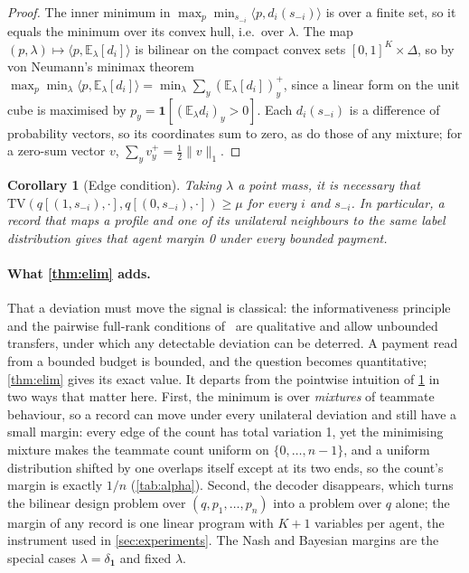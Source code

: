 \documentclass[sigconf,anonymous,acmthm=false]{acmart}
\theoremstyle{acmplain}
\newtheorem{corollary}{Corollary}
\theoremstyle{acmdefinition}
\newcommand{\E}{\mathbb{E}}
\newcommand{\TV}{\mathrm{TV}}
\begin{document}
\begin{proof}
The inner minimum in $\max_p\min_{s_{-i}}\langle p,d_i(s_{-i})\rangle$ is over a finite set,
so it equals the minimum over its convex hull, i.e.\ over $\lambda$. The map
$(p,\lambda)\mapsto\langle p,\E_\lambda[d_i]\rangle$ is bilinear on the compact convex sets
$[0,1]^K\times\Delta$, so by von Neumann's minimax theorem
$\max_p\min_\lambda\langle p,\E_\lambda[d_i]\rangle=\min_\lambda\sum_y(\E_\lambda[d_i])_y^+$,
since a linear form on the unit cube is maximised by $p_y=\mathbf1[(\E_\lambda d_i)_y>0]$.
Each $d_i(s_{-i})$ is a difference of probability vectors, so its coordinates sum to zero,
as do those of any mixture; for a zero-sum vector $v$, $\sum_yv_y^+=\frac12\|v\|_1$.
\end{proof}

\begin{corollary}[Edge condition]\label{cor:edge}
Taking $\lambda$ a point mass, it is necessary that
$\TV(q[(1,s_{-i}),\cdot],q[(0,s_{-i}),\cdot])\ge\mu$ for every $i$ and $s_{-i}$. In
particular, a record that maps a profile and one of its unilateral neighbours to the same
label distribution gives that agent margin 0 under every bounded payment.
\end{corollary}

\paragraph{What \cref{thm:elim} adds.} That a deviation must move the signal is classical:
the informativeness principle~\cite{holmstrom1979moral} and the pairwise full-rank
conditions of~\cite{fudenberg1994folk} are qualitative and allow unbounded transfers, under
which any detectable deviation can be deterred. A payment read from a bounded budget is
bounded, and the question becomes quantitative; \cref{thm:elim} gives its exact value. It
departs from the pointwise intuition of \cref{cor:edge} in two ways that matter here. First,
the minimum is over \emph{mixtures} of teammate behaviour, so a record can move under every
unilateral deviation and still have a small margin: every edge of the count has total
variation 1, yet the minimising mixture makes the teammate count uniform on
$\{0,\dots,n-1\}$, and a uniform distribution shifted by one overlaps itself except at its
two ends, so the count's margin is exactly $1/n$ (\cref{tab:alpha}). Second, the decoder
disappears, which turns the bilinear design problem over $(q,p_1,\dots,p_n)$ into a problem
over $q$ alone; the margin of any record is one linear program with $K+1$ variables per
agent, the instrument used in \cref{sec:experiments}. The Nash and Bayesian margins are the
special cases $\lambda=\delta_{\mathbf1}$ and fixed $\lambda$.
\end{document}

